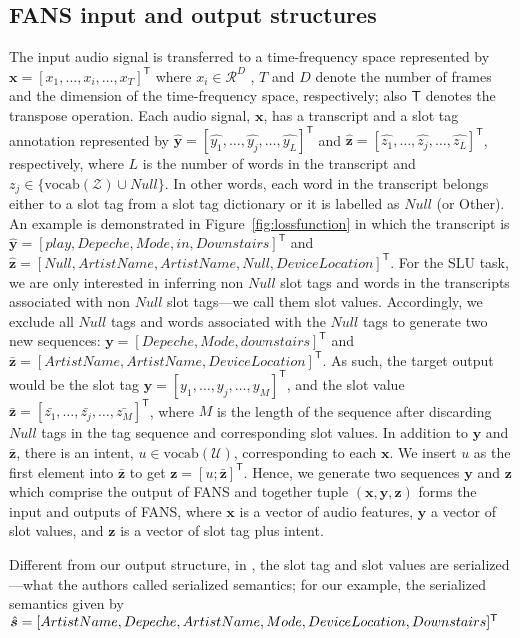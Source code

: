 \documentclass[a4paper]{article}
\begin{document}
\subsection{FANS input and output structures}
The input audio signal is transferred to a time-frequency  space represented by  $\bm{x}=[x_1,\ldots, x_i,\ldots,x_T]^\mathsf{T}$  where $x_i \in \mathcal{R}^D$ , $T$ and $D$ denote the number of frames and the dimension of the time-frequency space, respectively;  also $\mathsf{T}$ denotes the transpose operation. Each audio signal, $\bm{x}$, has a transcript and a slot tag annotation represented by  $\hat{\bm{y}}=[\hat{y_1},\ldots, \hat{y_j},\ldots,\hat{y_L}]^\mathsf{T}$ and  $\hat{\bm{z}}=[\hat{z_1},\ldots, \hat{z_j},\ldots,\hat{z_L}]^\mathsf{T}$, respectively, where $L$ is the number of words in the transcript and
 $z_j \in  \{\text{vocab}(\mathcal{Z}) \cup Null \}$. In other words, each word in the transcript belongs either to a slot tag from a slot tag dictionary or it is labelled as $Null$ (or Other). An example is demonstrated in Figure~\ref{fig:lossfunction} in which the transcript is $\hat{\bm{y}} =[play, Depeche, Mode, in, Downstairs]^\mathsf{T}$ and $\hat{\bm{z}} =[Null, ArtistName, ArtistName, Null , DeviceLocation]^\mathsf{T}$. For the SLU task, we are only interested in inferring non $Null$ slot tags and words in the transcripts associated with non $Null$ slot tags---we call them slot values.  Accordingly, we exclude all $Null$ tags and words associated with the $Null$ tags to generate two new sequences: $\bm{y} =[ Depeche,Mode,downstairs ]^\mathsf{T}$ and $\bar{\bm{z}} =[ ArtistName,ArtistName, DeviceLocation]^\mathsf{T}$. As such, the target output would be  the slot tag $\bm{y}=[y_1,\ldots, y_j,\ldots,y_M]^\mathsf{T}$, and the slot value $\bar{\bm{z}}=[\bar{z_1},\ldots, \bar{z_j},\ldots,\bar{z_M}]^\mathsf{T}$, where $M$ is the length of the sequence after discarding $Null$ tags in the tag sequence and corresponding slot values. In addition to $\bm{y}$ and $\bar{\bm{z}}$, there is an intent, $u\in \text{vocab}(\mathcal{U})$, corresponding  to each $\bm{x}$. We insert $u$ as the first element into $\bar{\bm{z}}$ to get  $ \bm{z} =[u;\bar{\bm{z}}]^\mathsf{T}$.  Hence, we generate two sequences $\bm{y}$ and $\bm{z}$ which comprise the output of FANS and  together tuple $(\bm{x},\bm{y},\bm{z})$ forms the input and outputs of FANS, where $\bm{x}$ is a vector of audio features, $ \bm{y}$ a vector of slot values, and $\bm{z}$ is a vector of slot tag plus intent. 
 
 Different from our output structure, in  \cite{haghani2018audio}, the slot tag and slot values are serialized---what the authors called serialized semantics; for our example,  the serialized semantics given by  $ \hat{\bm{s}} =[ ArtistName,Depeche,ArtistName,Mode,\\ DeviceLocation,Downstairs]^\mathsf{T}$ 
\end{document}
